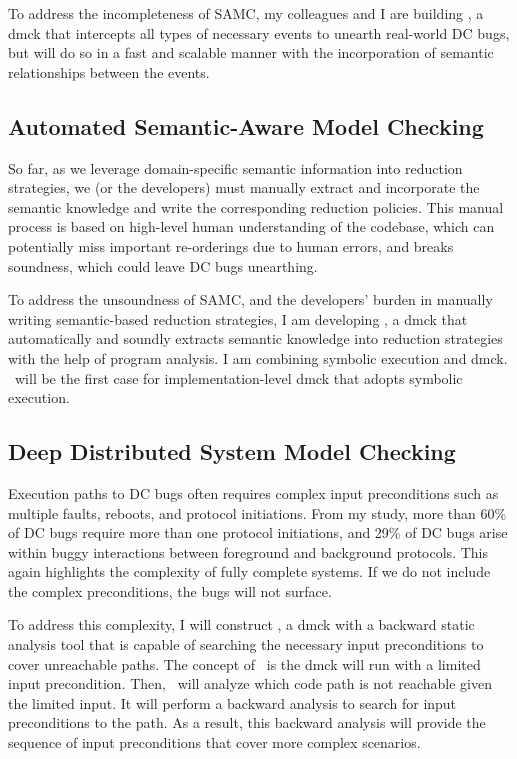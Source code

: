 \documentclass[11pt]{article}
\begin{document}
To address the incompleteness of SAMC, my colleagues and I are building
\fullcheck, a dmck that intercepts all types of necessary events to unearth
real-world DC bugs, but will do so in a fast and scalable manner with the
incorporation of semantic relationships between the events.
\fi

\subsection{Automated Semantic-Aware Model Checking} 

So far, as we leverage domain-specific semantic information into reduction
strategies, we (or the developers) must manually extract and incorporate the
semantic knowledge and write the corresponding reduction policies. This manual
process is based on high-level human understanding of the codebase, which can
potentially miss important re-orderings due to human errors, and breaks
soundness, which could leave DC bugs unearthing.

To address the unsoundness of SAMC, and the developers' burden in manually
writing semantic-based reduction strategies, I am developing \autocheck, a dmck
that automatically and soundly extracts semantic knowledge into reduction
strategies with the help of program analysis. I am combining symbolic execution
and dmck. \autocheck\ will be the first case for implementation-level dmck that
adopts symbolic execution. 

\subsection{Deep Distributed System Model Checking}

Execution paths to DC bugs often requires complex input preconditions such as
multiple faults, reboots, and protocol initiations. From my study, more than
60\% of DC bugs require more than one protocol initiations, and 29\% of DC bugs
arise within buggy interactions between foreground and background protocols.
This again highlights the complexity of fully complete systems. If we do not
include the complex preconditions, the bugs will not surface.

To address this complexity, I will construct \deepcheck, a dmck with a backward
static analysis tool that is capable of searching the necessary input
preconditions to cover unreachable paths. The concept of \deepcheck\ is the dmck
will run with a limited input precondition. Then, \deepcheck\ will analyze which
code path is not reachable given the limited input. It will perform a backward
analysis to search for input preconditions to the path. As a result, this
backward analysis will provide the sequence of input preconditions that cover
more complex scenarios.
\end{document}
